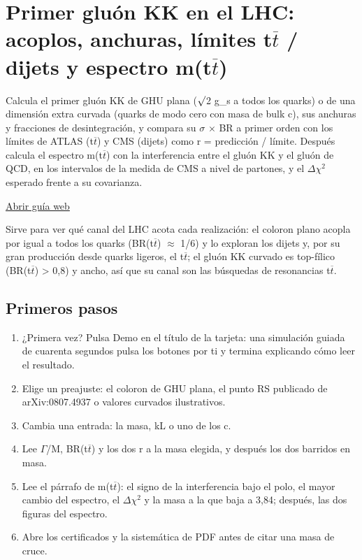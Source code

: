\documentclass[11pt,a4paper]{article}
\begin{document}
\section{Primer gluón KK en el LHC: acoplos, anchuras, límites t\ensuremath{\overline{t}} / dijets y espectro m(t\ensuremath{\overline{t}})}
Calcula el primer gluón KK de GHU plana (\ensuremath{\surd}2 g\_s a todos los quarks) o de una dimensión extra curvada (quarks de modo cero con masa de bulk c), sus anchuras y fracciones de desintegración, y compara su \ensuremath{\sigma} \ensuremath{\times} BR a primer orden con los límites de ATLAS (t\ensuremath{\overline{t}}) y CMS (dijets) como r = predicción / límite. Después calcula el espectro m(t\ensuremath{\overline{t}}) con la interferencia entre el gluón KK y el gluón de QCD, en los intervalos de la medida de CMS a nivel de partones, y el \ensuremath{\Delta}\ensuremath{\chi}\ensuremath{{}^{2}} esperado frente a su covarianza.

\href{https://karlesmarin.github.io/ghu-explorer/guide/es/kkgluon/index.html}{Abrir guía web}

Sirve para ver qué canal del LHC acota cada realización: el coloron plano acopla por igual a todos los quarks (BR(t\ensuremath{\overline{t}}) \ensuremath{\approx} 1/6) y lo exploran los dijets y, por su gran producción desde quarks ligeros, el t\ensuremath{\overline{t}}; el gluón KK curvado es top-fílico (BR(t\ensuremath{\overline{t}}) > 0,8) y ancho, así que su canal son las búsquedas de resonancias t\ensuremath{\overline{t}}.
\subsection*{Primeros pasos}
\begin{enumerate}
\item ¿Primera vez? Pulsa  Demo en el título de la tarjeta: una simulación guiada de cuarenta segundos pulsa los botones por ti y termina explicando cómo leer el resultado.
\item Elige un preajuste: el coloron de GHU plana, el punto RS publicado de arXiv:0807.4937 o valores curvados ilustrativos.
\item Cambia una entrada: la masa, kL o uno de los c.
\item Lee \ensuremath{\Gamma}/M, BR(t\ensuremath{\overline{t}}) y los dos r a la masa elegida, y después los dos barridos en masa.
\item Lee el párrafo de m(t\ensuremath{\overline{t}}): el signo de la interferencia bajo el polo, el mayor cambio del espectro, el \ensuremath{\Delta}\ensuremath{\chi}\ensuremath{{}^{2}} y la masa a la que baja a 3,84; después, las dos figuras del espectro.
\item Abre los certificados y la sistemática de PDF antes de citar una masa de cruce.
\end{enumerate}
\end{document}
